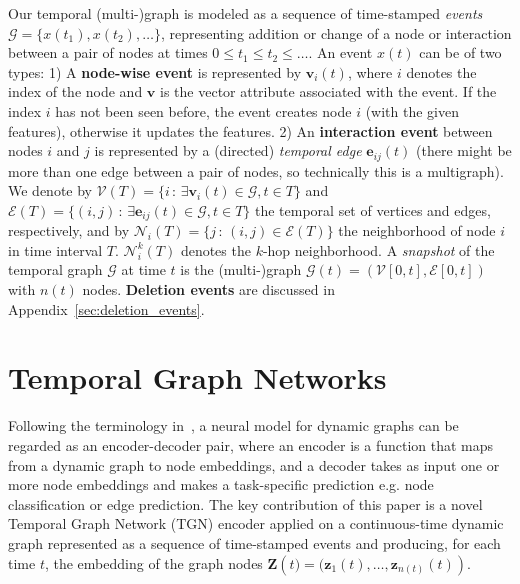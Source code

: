 \documentclass{article}
\begin{document}
Our temporal (multi-)graph is 
modeled as a sequence of time-stamped {\em events} $\mathcal{G} = \{ x(t_1), x(t_2), \hdots \}$, representing addition or change of a node or interaction between a pair of nodes at times $0\leq t_1 \leq t_2 \leq \hdots$. 
%
%
An event $x(t)$ can be of two types: 
%
1) A {\bf node-wise event} is represented by $\mathbf{v}_i(t)$, where $i$ denotes the index of the node and $\mathbf{v}$ is the vector attribute associated with the event. 
%
If the index $i$ has not been seen before, the event creates node $i$ (with the given features), otherwise it updates the features.    
%
%
2) An {\bf interaction event} between nodes $i$ and $j$ is represented by a (directed) {\em temporal edge} $\mathbf{e}_{ij}(t)$ (there might be more than one edge between a pair of nodes, so technically this is a multigraph).  
%
%
We denote by 
$\mathcal{V}(T) = \{ i \, : \, \exists\mathbf{v}_{i}(t) \in \mathcal{G}, t\in T \}$
and 
$\mathcal{E}(T) = \{ (i,j) \, : \, \exists\mathbf{e}_{ij}(t) \in \mathcal{G}, t\in T \}$ the temporal set of vertices and edges, respectively, 
and by $\mathcal{N}_i(T) = \{ j \, : \, (i,j) \in  \mathcal{E}(T)\}$ the neighborhood of node $i$ in time interval $T$. $\mathcal{N}^k_i(T)$ denotes the $k$-hop neighborhood. 
%
%
A {\em snapshot} of the temporal graph $\mathcal{G}$ at time $t$ is the (multi-)graph $\mathcal{G}(t) = ( \mathcal{V}[0,t], \mathcal{E}[0,t])$ with $n(t)$ nodes. 
%
{\bf Deletion events} are discussed in Appendix~\ref{sec:deletion_events}. 




\section{Temporal Graph Networks}

Following the terminology in~\citep{dynamic-graphs-survey}, a neural model for dynamic graphs can be regarded as an encoder-decoder pair, where an encoder is a function that maps from a dynamic graph to node embeddings, and a decoder takes as input  one or more node embeddings and makes a task-specific prediction e.g. node classification or edge prediction.
%
The key contribution of this paper is a novel Temporal Graph Network (TGN) encoder applied on a continuous-time dynamic graph represented as a sequence of time-stamped events and producing, for each time $t$, the embedding of the graph nodes $\mathbf{Z}\left(t) = (\mathbf{z}_1(t), \hdots, \mathbf{z}_{n(t)}(t)\right)$. 
\end{document}
